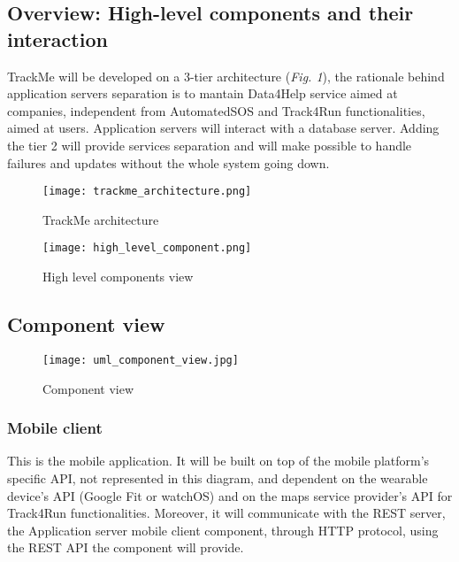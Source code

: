 \documentclass[../main.tex]{subfiles}
\begin{document}
\subsection{Overview: High-level components and their interaction}
 TrackMe will be developed on a 3-tier architecture (\textit{Fig. 1}), the rationale behind application servers separation
 is to mantain Data4Help service aimed at companies, independent from AutomatedSOS and Track4Run functionalities, aimed at users.
 Application servers will interact with a database server.
 Adding the tier 2 will provide services separation and will  make possible to handle failures and updates without the whole system going down.


\begin{figure}[ht]
\centering
     \texttt{[image: trackme\_architecture.png]}
      \caption{TrackMe architecture}
       \label{fig:trackme_architecture}
\end{figure}

\begin{figure}[ht]
    \centering
         \texttt{[image: high\_level\_component.png]}
          \caption{High level components view}
           \label{fig:high_level_components}
\end{figure}

\newpage
\subsection{Component view}
\begin{figure}[H]
	\texttt{[image: uml\_component\_view.jpg]}
	\caption{Component view}
	\label{fig:uml_component_view}
\end{figure}
\newpage

\subsubsection{Mobile client} This is the mobile application. It will be built on top of the mobile platform's specific API, not represented in this diagram, and dependent on the wearable device's API (Google Fit or watchOS) and on the maps service provider's API for Track4Run functionalities. Moreover, it will communicate with the REST server, the Application server mobile client component, through HTTP protocol, using the REST API the component will provide.
\end{document}
